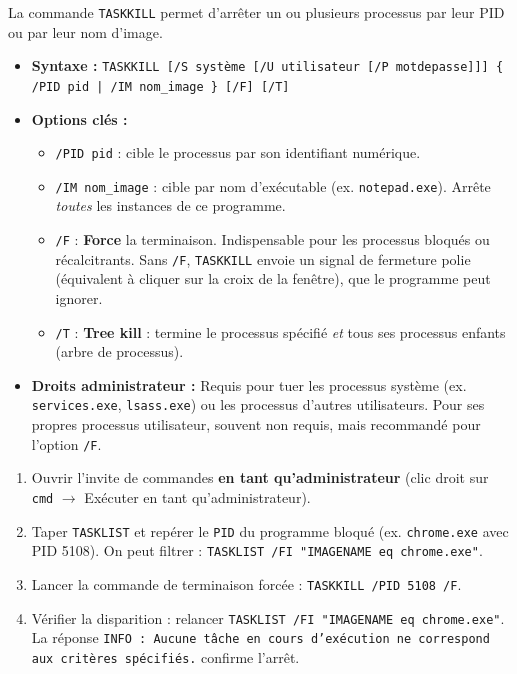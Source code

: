 \documentclass[11pt]{article}
\begin{document}
\begin{propriete}
La commande \texttt{TASKKILL} permet d'arrêter un ou plusieurs processus par leur PID ou par leur nom d'image.
\begin{itemize}
    \item \textbf{Syntaxe :} \texttt{TASKKILL [/S système [/U utilisateur [/P motdepasse]]] \{ /PID pid | /IM nom\_image \} [/F] [/T]}
    \item \textbf{Options clés :}
    \begin{itemize}
        \item \texttt{/PID pid} : cible le processus par son identifiant numérique.
        \item \texttt{/IM nom\_image} : cible par nom d'exécutable (ex. \texttt{notepad.exe}). Arrête \emph{toutes} les instances de ce programme.
        \item \texttt{/F} : \textbf{Force} la terminaison. Indispensable pour les processus bloqués ou récalcitrants. Sans \texttt{/F}, \texttt{TASKKILL} envoie un signal de fermeture polie (équivalent à cliquer sur la croix de la fenêtre), que le programme peut ignorer.
        \item \texttt{/T} : \textbf{Tree kill} : termine le processus spécifié \emph{et} tous ses processus enfants (arbre de processus).
    \end{itemize}
    \item \textbf{Droits administrateur :} Requis pour tuer les processus système (ex. \texttt{services.exe}, \texttt{lsass.exe}) ou les processus d'autres utilisateurs. Pour ses propres processus utilisateur, souvent non requis, mais recommandé pour l'option \texttt{/F}.
\end{itemize}
\end{propriete}

\begin{methode}
\begin{enumerate}
    \item Ouvrir l'invite de commandes \textbf{en tant qu'administrateur} (clic droit sur \texttt{cmd} $\to$ Exécuter en tant qu'administrateur).
    \item Taper \texttt{TASKLIST} et repérer le \texttt{PID} du programme bloqué (ex. \texttt{chrome.exe} avec PID 5108). On peut filtrer : \texttt{TASKLIST /FI "IMAGENAME eq chrome.exe"}.
    \item Lancer la commande de terminaison forcée : \texttt{TASKKILL /PID 5108 /F}.
    \item Vérifier la disparition : relancer \texttt{TASKLIST /FI "IMAGENAME eq chrome.exe"}. La réponse \texttt{INFO : Aucune tâche en cours d'exécution ne correspond aux critères spécifiés.} confirme l'arrêt.
\end{enumerate}
\end{methode}
\end{document}
